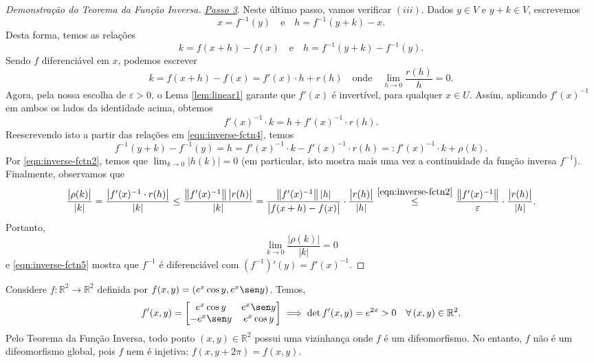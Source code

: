 \begin{proof}[Demonstração do Teorema da Função Inversa]
	\underline{\textit{Passo 3}}. Neste último passo, vamos verificar $(iii)$. Dados $y \in V$ e $y + k \in V$, escrevemos 
	\[
	x = f^{-1} (y) \quad \text{e} \quad h = f^{-1} (y + k) - x.
	\] Desta forma, temos as relações
	\begin{equation}\label{eqn:inverse-fctn4}
	k = f(x + h) - f(x) \quad \text{e} \quad h = f^{-1}(y + k) - f^{-1}(y).
	\end{equation} Sendo $f$ diferenciável em $x$, podemos escrever
	\[
	k = f(x + h) - f(x) = f'(x) \cdot h + r(h) \quad \text{onde} \quad \lim_{h \to 0} \frac{r(h)}{h} = 0.
	\] Agora, pela nossa escolha de $\varepsilon >0$, o Lema \ref{lem:linear1} garante que $f'(x)$ é invertível, para qualquer $x \in U$. Assim, aplicando $f'(x)^{-1}$ em ambos os lados da identidade acima, obtemos
	\[
	f'(x)^{-1}\cdot k =  h + f'(x)^{-1}\cdot r(h).
	\] Reescrevendo isto a partir das relações em \eqref{eqn:inverse-fctn4}, temos
	\begin{equation}\label{eqn:inverse-fctn5}
	f^{-1}(y + k) - f^{-1}(y) = h = f'(x)^{-1}\cdot k - f'(x)^{-1}\cdot r(h) =: f'(x)^{-1}\cdot k + \rho(k).
	\end{equation} Por \eqref{eqn:inverse-fctn2}, temos que $\lim_{k \to 0} \big| h(k) \big| = 0$ (em particular, isto mostra mais uma vez a continuidade da função inversa $f^{-1}$). Finalmente, observamos que
	\[
	\frac{\big| \rho(k) \big|}{|k|} = \frac{\big| f'(x)^{-1}\cdot r(h) \big|}{|k|} \le \frac{\big\| f'(x)^{-1} \big\| \, \big| r(h) \big|}{|k|} = \frac{\big\| f'(x)^{-1} \big\| \, |h|}{\big|f(x+h) - f(x)\big|} \cdot \frac{ \big|r(h) \big|}{|h|} \stackrel{\eqref{eqn:inverse-fctn2}}{\le} \frac{\big\| f'(x)^{-1} \big\|}{\varepsilon} \cdot \frac{ \big|r(h) \big|}{|h|}.
	\] Portanto,
	\[
	\lim_{k \to 0} \frac{\big| \rho(k) \big|}{|k|} = 0
	\] e \eqref{eqn:inverse-fctn5} mostra que $f^{-1}$ é diferenciável com $(f^{-1})'(y) = f' (x)^{-1}$.
\end{proof}

\begin{ex}
	Considere $f: \mathbb{R}^2 \to \mathbb{R}^2$ definida por $f(x,y) = (e^x \cos y, e^x \sen y)$. Temos,
	\[
	f'(x,y) = \begin{bmatrix}
	e^x \cos y & e^x \sen y \\
	-e^x \sen y & e^x \cos y
	\end{bmatrix} \implies \det f'(x,y) = e^{2x} > 0 \quad \forall \, (x,y) \in \mathbb{R}^2.
	\] Pelo Teorema da Função Inversa, todo ponto $(x,y) \in \mathbb{R}^2$ possui uma vizinhança onde $f$ é um difeomorfismo. No entanto, $f$ não é um difeomorfismo global, pois $f$ nem é injetiva: $f(x,y + 2 \pi) = f(x,y)$.
\end{ex}


